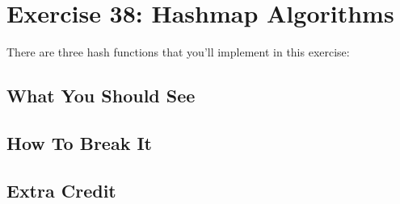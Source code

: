 \chapter{Exercise 38: Hashmap Algorithms}

There are three hash functions that you'll implement in this exercise:





\section{What You Should See}


\section{How To Break It}


\section{Extra Credit}



